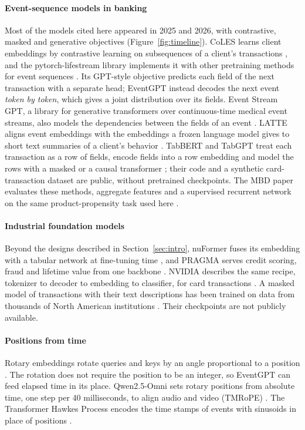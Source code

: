 \documentclass[12pt]{article}
\begin{document}
\paragraph{Event-sequence models in banking} Most of the models cited here appeared in 2025 and 2026, with contrastive, masked and generative objectives (Figure~\ref{fig:timeline}). CoLES learns client embeddings by contrastive learning on subsequences of a client's transactions \cite{coles}, and the pytorch-lifestream library implements it with other pretraining methods for event sequences \cite{lifestream}. Its GPT-style objective predicts each field of the next transaction with a separate head; EventGPT instead decodes the next event \emph{token by token}, which gives a joint distribution over its fields. Event Stream GPT, a library for generative transformers over continuous-time medical event streams, also models the dependencies between the fields of an event \cite{esgpt}. LATTE aligns event embeddings with the embeddings a frozen language model gives to short text summaries of a client's behavior \cite{latte}. TabBERT and TabGPT treat each transaction as a row of fields, encode fields into a row embedding and model the rows with a masked or a causal transformer \cite{tabbert}; their code and a synthetic card-transaction dataset are public, without pretrained checkpoints. The MBD paper evaluates these methods, aggregate features and a supervised recurrent network on the same product-propensity task used here \cite{mbd}.

\paragraph{Industrial foundation models} Beyond the designs described in Section~\ref{sec:intro}, nuFormer fuses its embedding with a tabular network at fine-tuning time \cite{nuformer}, and PRAGMA serves credit scoring, fraud and lifetime value from one backbone \cite{pragma}. NVIDIA describes the same recipe, tokenizer to decoder to embedding to classifier, for card transactions \cite{nvidia}. A masked model of transactions with their text descriptions has been trained on data from thousands of North American institutions \cite{openbanking}. Their checkpoints are not publicly available.

\paragraph{Positions from time} Rotary embeddings rotate queries and keys by an angle proportional to a position \cite{rope}. The rotation does not require the position to be an integer, so EventGPT can feed elapsed time in its place. Qwen2.5-Omni sets rotary positions from absolute time, one step per 40 milliseconds, to align audio and video (TMRoPE) \cite{qwenomni}. The Transformer Hawkes Process encodes the time stamps of events with sinusoids in place of positions \cite{thp}.
\end{document}
